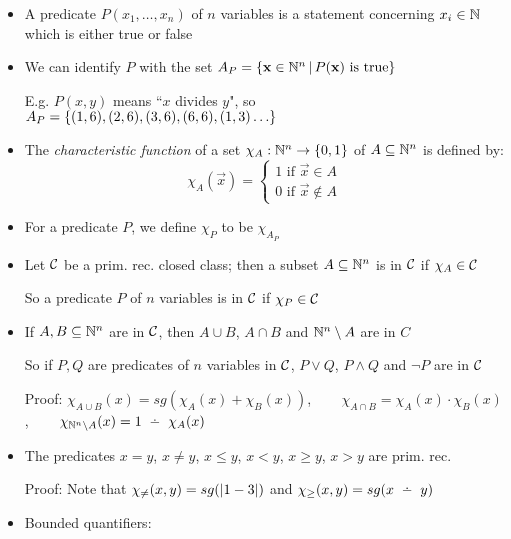 \begin{itemize}
	\item A predicate $ P(x_1, \dots, x_n) $ of $ n $ variables is a statement concerning $ x_i \in \mathbb{N}$ which is either true or false
	
	\item We can identify $ P $ with the set $ A_P = \left\lbrace \mathbf{x} \in \mathbb{N}^n \, | \, P(\mathbf{x}) \text{ is true} \right\rbrace $
	
	\subitem E.g. $ P(x, y) $ means ``$ x $ divides $ y $", so $ A_P = \set{(1, 6), (2, 6), (3, 6), (6, 6), (1, 3) \dots} $
		
	\item The \textit{characteristic function} of a set $ \chi_A: \mathbb{N}^n \to \left\lbrace 0, 1 \right\rbrace $ of $ A \subseteq \mathbb{N}^n $ is defined by:
	\begin{equation*}
	\chi_A(\vec{x}) = \begin{cases}
	1 \text{ if } \vec{x} \in A\\
	0 \text{ if } \vec{x} \notin A
	\end{cases}
	\end{equation*}
	\item For a predicate $ P $, we define $ \chi_P $ to be $ \chi_{A_P} $
	
	\item Let $ \mathcal{C} $ be a prim. rec. closed class; then a subset $ A \subseteq \mathbb{N}^n $ is in $ \mathcal{C} $ if $ \chi_A \in \mathcal{C} $
	
	\subitem So a predicate $ P $ of $ n $ variables is in $ \mathcal{C} $ if $ \chi_P \in \mathcal{C} $
	
	\item If $ A, B \subseteq \mathbb{N}^n $ are in $ \mathcal{C} $, then $ A \cup B $, $ A \cap B $ and $ \mathbb{N}^n \setminus A $ are in $ C $
	
	\subitem So if $ P, Q $ are predicates of $ n $ variables in $ \mathcal{C} $, $ P \lor Q $, $ P \land Q $ and $ \lnot P $ are in $ \mathcal{C} $
	
	\subitem Proof: $ \chi_{A \cup B}(x) = sg(\chi_A(x) + \chi_B(x)) $, ~~~ $ \chi_{A \cap B} = \chi_A(x) \cdot \chi_B(x) $, ~~~ $ \chi_{\Nat^n \setminus A}(x) = 1 \monus \chi_A(x) $
	
	\item The predicates $ x = y $, $ x \ne y $, $ x \le y $, $ x < y $, $ x \ge y $, $ x > y $ are prim. rec.
	
	\subitem Proof: Note that $ \chi_{\ne} (x, y) = sg(\abs{1 - 3}) $ and $ \chi_{\ge} (x, y) = sg(x \monus y) $
	
	\item Bounded quantifiers:
	

\end{itemize}
